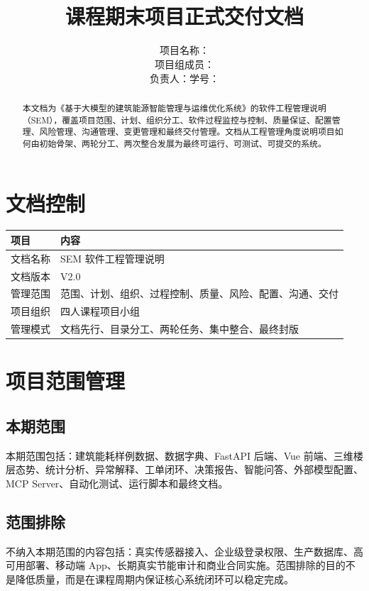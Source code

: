 \documentclass[12pt,a4paper]{ctexart}
\title{
    \vspace{-2em}
    \heiti \zihao{2} \reporttitle \\
    \vspace{1em}
    \zihao{4} 课程期末项目正式交付文档
}
\author{
    \songti \zihao{4}
    项目名称：\projectname \\
    项目组成员：\teamname \\
    负责人：\studentname \quad 学号：\studentid
}
\date{\docdate}
\newcommand{\projectname}{基于大模型的建筑能源智能管理与运维优化系统}
\newcommand{\docversion}{V2.0}
\begin{document}
\maketitle
\thispagestyle{fancy}

\begin{abstract}
本文档为《\projectname》的软件工程管理说明（SEM），覆盖项目范围、计划、组织分工、软件过程监控与控制、质量保证、配置管理、风险管理、沟通管理、变更管理和最终交付管理。文档从工程管理角度说明项目如何由初始骨架、两轮分工、两次整合发展为最终可运行、可测试、可提交的系统。
\end{abstract}

\tableofcontents
\newpage

\section{文档控制}
\begin{longtable}{p{4cm}p{10.5cm}}
\toprule
项目 & 内容 \\
\midrule
文档名称 & SEM 软件工程管理说明 \\
文档版本 & \docversion \\
管理范围 & 范围、计划、组织、过程控制、质量、风险、配置、沟通、交付 \\
项目组织 & 四人课程项目小组 \\
管理模式 & 文档先行、目录分工、两轮任务、集中整合、最终封版 \\
\bottomrule
\end{longtable}

\section{项目范围管理}
\subsection{本期范围}
本期范围包括：建筑能耗样例数据、数据字典、FastAPI 后端、Vue 前端、三维楼层态势、统计分析、异常解释、工单闭环、决策报告、智能问答、外部模型配置、MCP Server、自动化测试、运行脚本和最终文档。

\subsection{范围排除}
不纳入本期范围的内容包括：真实传感器接入、企业级登录权限、生产数据库、高可用部署、移动端 App、长期真实节能审计和商业合同实施。范围排除的目的不是降低质量，而是在课程周期内保证核心系统闭环可以稳定完成。
\end{document}
